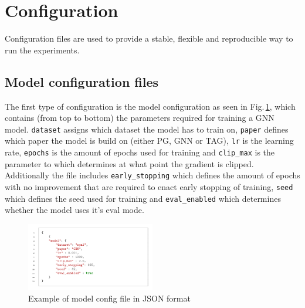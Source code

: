 \section{Configuration}
Configuration files are used to provide a stable, flexible and reproducible way to run the experiments.
\subsection{Model configuration files}
The first type of configuration is the model configuration as seen in Fig.\,\ref{fig:model-config-example}, which contains (from top to bottom) the parameters required for training a GNN model. \texttt{dataset} assigns which dataset the model has to train on, \texttt{paper} defines which paper the model is build on (either PG, GNN or TAG), \texttt{lr} is the learning rate, \texttt{epochs} is the amount of epochs used for training and \texttt{clip\_max} is the parameter to which determines at what point the gradient is clipped. Additionally the file includes \texttt{early\_stopping} which defines the amount of epochs with no improvement that are required to enact early stopping of training, \texttt{seed} which defines the seed used for training and \texttt{eval\_enabled} which determines whether the model uses it's eval mode.
\begin{figure}[h!]
    \centering
    \includegraphics[width=0.5\textwidth]{../openreview/imgs/config-examples/model-config-example.png}
    \caption{Example of model config file in JSON format} 
\label{fig:model-config-example}
\end{figure}


